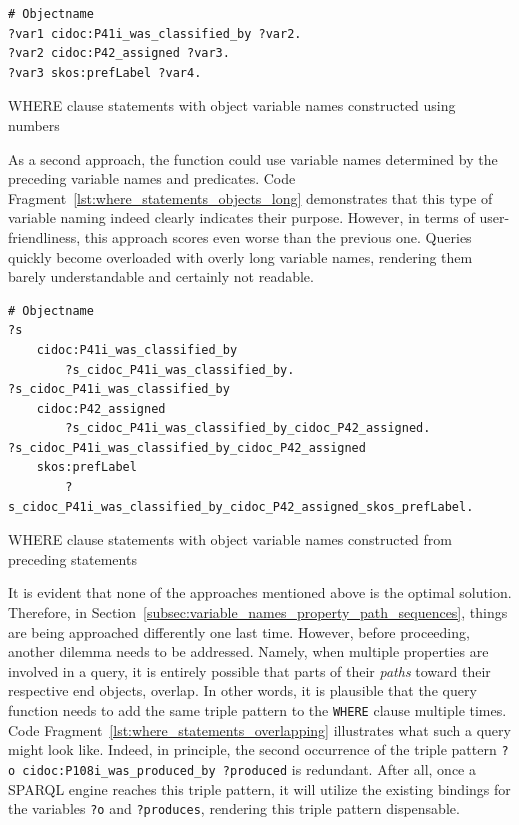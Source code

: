 \begin{listing}[htbp]
    \begin{verbatim}
# Objectname
?var1 cidoc:P41i_was_classified_by ?var2.
?var2 cidoc:P42_assigned ?var3.
?var3 skos:prefLabel ?var4.
    \end{verbatim}
    \caption{WHERE clause statements with object variable names constructed using numbers}
    \label{lst:where_statements_objects_numbers}
\end{listing}

As a second approach, the function could use variable names determined by the preceding variable names and predicates. Code Fragment~\ref{lst:where_statements_objects_long} demonstrates that this type of variable naming indeed clearly indicates their purpose. However, in terms of user-friendliness, this approach scores even worse than the previous one. Queries quickly become overloaded with overly long variable names, rendering them barely understandable and certainly not readable.

\begin{listing}[htbp]
    \begin{verbatim}
# Objectname
?s
    cidoc:P41i_was_classified_by
        ?s_cidoc_P41i_was_classified_by.
?s_cidoc_P41i_was_classified_by
    cidoc:P42_assigned
        ?s_cidoc_P41i_was_classified_by_cidoc_P42_assigned.
?s_cidoc_P41i_was_classified_by_cidoc_P42_assigned
    skos:prefLabel
        ?s_cidoc_P41i_was_classified_by_cidoc_P42_assigned_skos_prefLabel.
    \end{verbatim}
    \caption{WHERE clause statements with object variable names constructed from preceding statements}
    \label{lst:where_statements_objects_long}
\end{listing}

It is evident that none of the approaches mentioned above is the optimal solution. Therefore, in Section~\ref{subsec:variable_names_property_path_sequences}, things are being approached differently one last time. However, before proceeding, another dilemma needs to be addressed. Namely, when multiple properties are involved in a query, it is entirely possible that parts of their \textit{paths} toward their respective end objects, overlap. In other words, it is plausible that the query function needs to add the same triple pattern to the \texttt{WHERE} clause multiple times. Code Fragment~\ref{lst:where_statements_overlapping} illustrates what such a query might look like. Indeed, in principle, the second occurrence of the triple pattern \texttt{?o cidoc:P108i_was_produced_by ?produced} is redundant. After all, once a SPARQL engine reaches this triple pattern, it will utilize the existing bindings for the variables \texttt{?o} and \texttt{?produces}, rendering this triple pattern dispensable.

